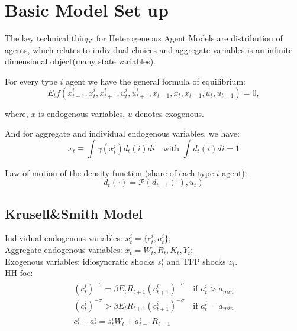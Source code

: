 
% 



\section{Basic Model Set up}

The key technical things for Heterogeneous Agent Models are distribution of agents, which relates to individual choices and aggregate variables is an {\color{red} infinite dimensional object}(many state variables). 

For every type $i$ agent we have the general formula of equilibrium: 
\[ 
E_t f(x^i_{t-1}, x^i_{t}, x^i_{t+1},u^i_{t},u^i_{t+1},x_{t-1}, x_{t}, x_{t+1},u_{t},u_{t+1})=0, 
\]


where, $x$ is endogenous variables, $u$ denotes exogenous. 

And for aggregate and individual endogenous variables, we have: 
\[
x_t \equiv \int \gamma (x_t^i)d_t (i)di \quad \text{with } \int d_t (i)di = 1 
\]

Law of motion of the density function (share of each type $i$ agent): 
\[ d_t (\cdot) = \mathcal{P}(d_{t-1}(\cdot), u_t)\]

\subsection{Krusell\&Smith Model}

Individual endogenous variables: $x^i_t = \{c^i_t,a^i_t\}$;\\

Aggregate endogenous variables: $x_t = W_t,R_t,K_t,Y_t$;\\

Exogenous variables: idiosyncratic shocks $s^i_t$ and TFP shocks $z_t$.\\

HH foc: 
\begin{align}
\begin{split}
(c^i_t)^{-\sigma} = \beta E_t R_{t+1}(c^i_{t+1})^{-\sigma} \quad \text{if } a^i_t > a_{min} \\
(c^i_t)^{-\sigma} > \beta E_t R_{t+1}(c^i_{t+1})^{-\sigma} \quad \text{if } a^i_t = a_{min} \\
c^i_t + a^i_t = s^i_t W_t + a^i_{t-1} R_{t-1}
\end{split}\label{hhfoc}
\end{align}

